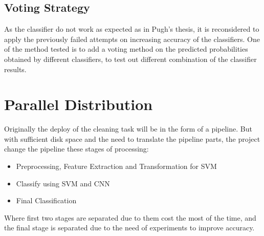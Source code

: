 \documentclass[bsc,logo,twoside,fullspacing,parskip]{infthesis}
\begin{document}

\section{Voting Strategy}
\label{sec:voting}

As the classifier do not work as expected as in Pugh's thesis, it is reconsidered to apply the previously failed attempts on increasing accuracy of the classifiers.
One of the method tested is to add a voting method on the predicted probabilities obtained by different classifiers, to test out different combination of the classifier results.






\chapter{Parallel Distribution}
\label{chap:parallel}

Originally the deploy of the cleaning task will be in the form of a pipeline.
But with sufficient disk space and the need to translate the pipeline parts, the project change the pipeline these stages of processing:

\begin{itemize}
   \setlength{\parskip}{3pt}
   \item Preprocessing, Feature Extraction and Transformation for SVM
   \item Classify using SVM and CNN
   \item Final Classification
\end{itemize}
Where first two stages are separated due to them cost the most of the time, and the final stage is separated due to the need of experiments to improve accuracy.
\end{document}
